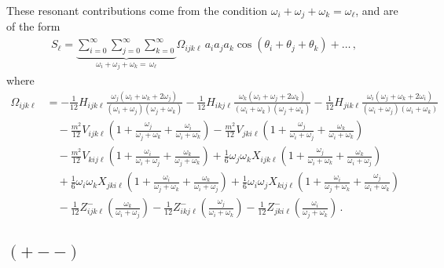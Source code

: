 \documentclass[letterpaper,11pt]{article}
\newcommand{\oi}{\omega_i}
\newcommand{\oj}{\omega_j}
\newcommand{\ok}{\omega_k}
\newcommand{\ol}{\omega_\ell}
\newcommand{\thi}{\theta_i}
\newcommand{\thj}{\theta_j}
\newcommand{\thk}{\theta_k}
\begin{document}
These resonant contributions come from the condition $\oi + \oj + \ok = \ol$, and are of the form
\begin{align}
S_\ell = \underbrace{\sum_{i=0}^\infty \sum_{j=0}^\infty \sum_{k=0}^\infty}_{\oi + \oj + \ok = \, \ol} \Omega_{ijk\ell} \, a_i a_j a_k \cos \left( \thi + \thj + \thk \right) + \ldots \, ,
\end{align}
where
\begin{align}
\label{omega}
\Omega_{ijk\ell} &= -\frac{1}{12}H_{ijk\ell} \frac{\oj (\oi + \ok +2\oj)}{(\oi + \oj)(\oj + \ok)} - \frac{1}{12} H_{ikj\ell} \frac{\ok (\oi + \oj + 2\ok)}{(\oi + \ok)(\oj + \ok)}- \frac{1}{12} H_{jik\ell} \frac{\oi (\oj + \ok +2\oi)}{(\oi + \oj)(\oi + \ok)} \nonumber \\
%
& \quad - \frac{m^2}{12} V_{ijk\ell} \left( 1 + \frac{\oj}{\oj + \ok} + \frac{\oi}{\oi + \ok} \right) - \frac{m^2}{12} V_{jki\ell} \left( 1 + \frac{\oj}{\oi + \oj} + \frac{\ok}{\oi + \ok} \right) \nonumber \\
%
& \quad - \frac{m^2}{12} V_{kij\ell} \left( 1 + \frac{\oi}{\oi + \oj} + \frac{\ok}{\oj + \ok} \right)  + \frac{1}{6} \oj \ok X_{ijk\ell} \left( 1 + \frac{\oj}{\oi + \ok} + \frac{\ok}{\oi + \oj} \right) \nonumber \\
%
& \quad + \frac{1}{6} \oi \ok X_{jki\ell} \left( 1 + \frac{\oi}{\oj + \ok} + \frac{\ok}{\oi + \oj} \right) + \frac{1}{6} \oi \oj X_{kij\ell} \left( 1 + \frac{\oi}{\oj + \ok} + \frac{\oj}{\oi + \ok} \right) \nonumber \\
%
& \quad - \frac{1}{12} Z^-_{ijk\ell} \left( \frac{\ok}{\oi + \oj} \right) - \frac{1}{12} Z^-_{ikj\ell} \left( \frac{\oj}{\oi + \ok} \right) - \frac{1}{12} Z^-_{jki\ell}  \left( \frac{\oi}{\oj + \ok} \right) \, .
\end{align}


\subsection{$(+--)$}
\end{document}
